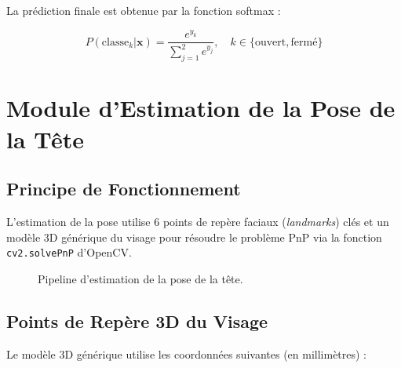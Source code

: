 \documentclass[12pt,a4paper,twoside]{report}
\begin{document}
La prédiction finale est obtenue par la fonction softmax :

\begin{equation}
P(\text{classe}_k | \mathbf{x}) = \frac{e^{y_k}}{\sum_{j=1}^{2} e^{y_j}}, \quad k \in \{\text{ouvert}, \text{fermé}\}
\label{eq:softmax}
\end{equation}

\section{Module d'Estimation de la Pose de la Tête}

\subsection{Principe de Fonctionnement}

L'estimation de la pose utilise 6 points de repère faciaux (\textit{landmarks}) clés et un modèle 3D générique du visage pour résoudre le problème PnP via la fonction \texttt{cv2.solvePnP} d'OpenCV.

\begin{figure}[H]
\centering
{}
\caption{Pipeline d'estimation de la pose de la tête.}
\label{fig:head_pose_pipeline}
\end{figure}

\subsection{Points de Repère 3D du Visage}

Le modèle 3D générique utilise les coordonnées suivantes (en millimètres) :
\end{document}
